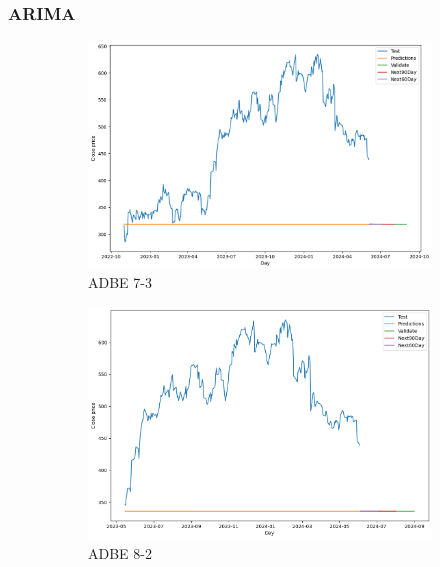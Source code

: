 \documentclass{ieeeojies}
\begin{document}
\subsubsection{ARIMA}
\begin{figure}[H]
    \centering
    \begin{subfigure}[h]{0.33\linewidth}
        \centering
        \includegraphics[width=\linewidth]{ARIMA Plot/ARIMA_ADBE_7_3.png}
        \caption{ADBE 7-3}
        \label{fig:adbe-7-3}
    \end{subfigure}%
    \hfill
    \begin{subfigure}[h]{0.33\linewidth}
        \centering
        \includegraphics[width=\linewidth]{ARIMA Plot/ARIMA_ADBE_8_2.png}
        \caption{ADBE 8-2}
        \label{fig:adbe-8-2}
    \end{subfigure}%
    \hfill
    \begin{subfigure}[h]{0.33\linewidth}

\end{subfigure}
\end{figure}
\end{document}
